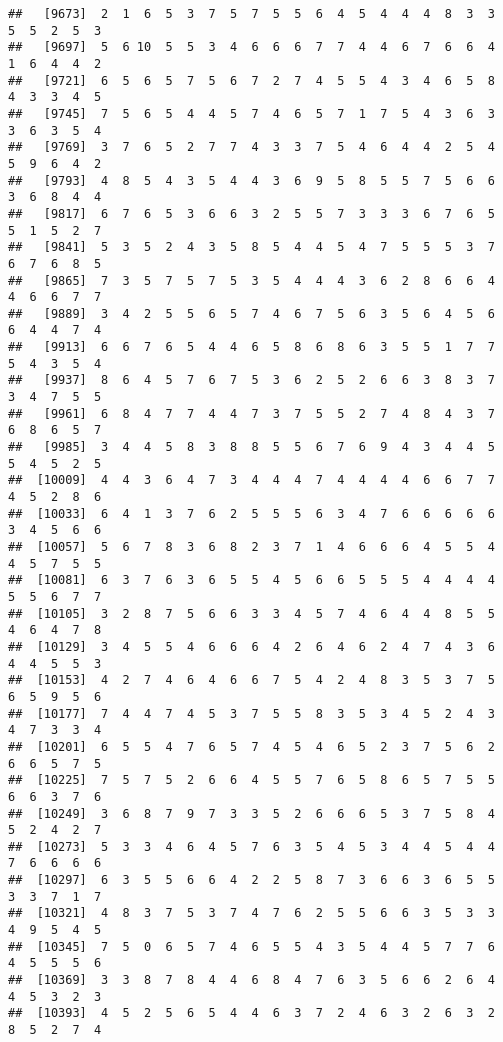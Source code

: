 \documentclass[
]{book}
\begin{document}
\begin{verbatim}
##   [9673]  2  1  6  5  3  7  5  7  5  5  6  4  5  4  4  4  8  3  3  5  5  2  5  3
##   [9697]  5  6 10  5  5  3  4  6  6  6  7  7  4  4  6  7  6  6  4  1  6  4  4  2
##   [9721]  6  5  6  5  7  5  6  7  2  7  4  5  5  4  3  4  6  5  8  4  3  3  4  5
##   [9745]  7  5  6  5  4  4  5  7  4  6  5  7  1  7  5  4  3  6  3  3  6  3  5  4
##   [9769]  3  7  6  5  2  7  7  4  3  3  7  5  4  6  4  4  2  5  4  5  9  6  4  2
##   [9793]  4  8  5  4  3  5  4  4  3  6  9  5  8  5  5  7  5  6  6  3  6  8  4  4
##   [9817]  6  7  6  5  3  6  6  3  2  5  5  7  3  3  3  6  7  6  5  5  1  5  2  7
##   [9841]  5  3  5  2  4  3  5  8  5  4  4  5  4  7  5  5  5  3  7  6  7  6  8  5
##   [9865]  7  3  5  7  5  7  5  3  5  4  4  4  3  6  2  8  6  6  4  4  6  6  7  7
##   [9889]  3  4  2  5  5  6  5  7  4  6  7  5  6  3  5  6  4  5  6  6  4  4  7  4
##   [9913]  6  6  7  6  5  4  4  6  5  8  6  8  6  3  5  5  1  7  7  5  4  3  5  4
##   [9937]  8  6  4  5  7  6  7  5  3  6  2  5  2  6  6  3  8  3  7  3  4  7  5  5
##   [9961]  6  8  4  7  7  4  4  7  3  7  5  5  2  7  4  8  4  3  7  6  8  6  5  7
##   [9985]  3  4  4  5  8  3  8  8  5  5  6  7  6  9  4  3  4  4  5  5  4  5  2  5
##  [10009]  4  4  3  6  4  7  3  4  4  4  7  4  4  4  4  6  6  7  7  4  5  2  8  6
##  [10033]  6  4  1  3  7  6  2  5  5  5  6  3  4  7  6  6  6  6  6  3  4  5  6  6
##  [10057]  5  6  7  8  3  6  8  2  3  7  1  4  6  6  6  4  5  5  4  4  5  7  5  5
##  [10081]  6  3  7  6  3  6  5  5  4  5  6  6  5  5  5  4  4  4  4  5  5  6  7  7
##  [10105]  3  2  8  7  5  6  6  3  3  4  5  7  4  6  4  4  8  5  5  4  6  4  7  8
##  [10129]  3  4  5  5  4  6  6  6  4  2  6  4  6  2  4  7  4  3  6  4  4  5  5  3
##  [10153]  4  2  7  4  6  4  6  6  7  5  4  2  4  8  3  5  3  7  5  6  5  9  5  6
##  [10177]  7  4  4  7  4  5  3  7  5  5  8  3  5  3  4  5  2  4  3  4  7  3  3  4
##  [10201]  6  5  5  4  7  6  5  7  4  5  4  6  5  2  3  7  5  6  2  6  6  5  7  5
##  [10225]  7  5  7  5  2  6  6  4  5  5  7  6  5  8  6  5  7  5  5  6  6  3  7  6
##  [10249]  3  6  8  7  9  7  3  3  5  2  6  6  6  5  3  7  5  8  4  5  2  4  2  7
##  [10273]  5  3  3  4  6  4  5  7  6  3  5  4  5  3  4  4  5  4  4  7  6  6  6  6
##  [10297]  6  3  5  5  6  6  4  2  2  5  8  7  3  6  6  3  6  5  5  3  3  7  1  7
##  [10321]  4  8  3  7  5  3  7  4  7  6  2  5  5  6  6  3  5  3  3  4  9  5  4  5
##  [10345]  7  5  0  6  5  7  4  6  5  5  4  3  5  4  4  5  7  7  6  4  5  5  5  6
##  [10369]  3  3  8  7  8  4  4  6  8  4  7  6  3  5  6  6  2  6  4  4  5  3  2  3
##  [10393]  4  5  2  5  6  5  4  4  6  3  7  2  4  6  3  2  6  3  2  8  5  2  7  4

\end{verbatim}
\end{document}
